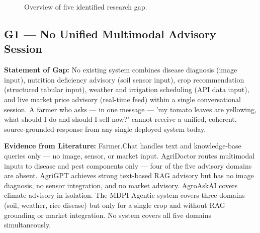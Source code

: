 \documentclass[12pt,a4paper]{article}
\begin{document}
\begin{figure}[htbp]
    \centering
    \caption{Overview of five identified research gap.}
    \label{fig:five_gaps}
\end{figure}

\subsection{G1 --- No Unified Multimodal Advisory Session}
\textbf{Statement of Gap:}
No existing system combines disease diagnosis (image input), nutrition deficiency advisory (soil sensor input), crop recommendation (structured tabular input), weather and irrigation scheduling (API data input), and live market price advisory (real-time feed) within a single conversational session. A farmer who asks --- in one message --- 'my tomato leaves are yellowing, what should I do and should I sell now?' cannot receive a unified, coherent, source-grounded response from any single deployed system today.

\noindent\textbf{Evidence from Literature:}
Farmer.\allowbreak Chat \cite{farmerchat2024} handles text and knowledge-base queries only --- no image, sensor, or market input. AgriDoctor \cite{agridoctor2025} routes multimodal inputs to disease and pest components only --- four of the five advisory domains are absent. AgriGPT \cite{agrigpt2025} achieves strong text-based RAG advisory but has no image diagnosis, no sensor integration, and no market advisory. AgroAskAI \cite{agroaskai2024} covers climate advisory in isolation. The MDPI Agentic system \cite{agenticmdpi2026} covers three domains (soil, weather, rice disease) but only for a single crop and without RAG grounding or market integration. No system covers all five domains simultaneously.
\end{document}
